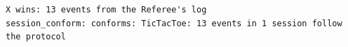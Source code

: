 \begin{lstlisting}[language={},basicstyle=\ttfamily\footnotesize,breaklines=true]
X wins: 13 events from the Referee's log
session_conform: conforms: TicTacToe: 13 events in 1 session follow the protocol
\end{lstlisting}
